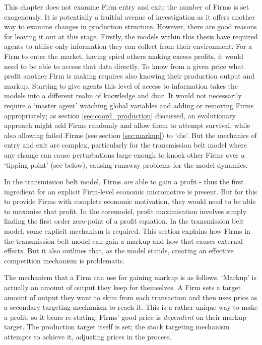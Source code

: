 This chapter does not examine Firm entry and exit: the number of Firms is set exogenously. It is potentially a fruitful avenue of investigation as it offers another way to examine changes in production structure. However, there are good reasons for leaving it out at this stage. Firstly, the models within this thesis have required agents to utilise only information they can collect from their environment. For a Firm to enter the market, having spied others making excess profits, it would need to be able to access that data directly. To know from a given price what profit another Firm is making requires also knowing their production output and markup. Starting to give agents this level of access to information takes the models into a different realm of knowledge and \gls{dmr}. It would not necessarily require a `master agent' watching global variables and adding or removing Firms appropriately; as section \ref{sec:coord_production} discussed, an evolutionary approach might add Firms randomly and allow them to attempt survival, while also allowing failed Firms (see section \ref{sec:markup}) to `die'. But the mechanics of entry and exit are complex, particularly for the transmission belt model where any change can cause perturbations large enough to knock other Firms over a `tipping point' (see below), causing runaway problems for the model dynamics. 

In the transmission belt model, Firms \emph{are} able to gain a profit - thus the first ingredient for an explicit Firm-level economic micromotive is present. But for this to provide Firms with complete economic motivation, they would need to be able to maximise that profit. In the \gls{coremodel}, profit maximisation involves simply finding the first order zero-point of a profit equation. In the transmission belt model, some explicit mechanism is required. This section explains how Firms in the transmission belt model can gain a markup and how that causes external effects. But it also outlines that, as the model stands, creating an effective competition mechanism is problematic.

The mechanism that a Firm can use for gaining markup is as follows. `Markup' is actually an amount of output they keep for themselves. A Firm sets a target amount of output they want to skim from each transaction and then uses price as a secondary targeting mechanism to reach it. This is a rather unique way to make a profit, so it bears re-stating: Firms' good price is \emph{dependent} on their markup target. The production target itself is set; the stock targeting mechanism attempts to achieve it, adjusting prices in the process. 

